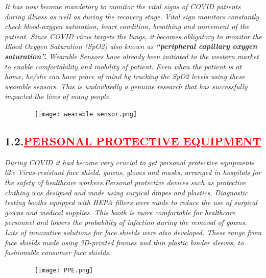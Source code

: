 \documentclass[12pt]{article}
\begin{document}
\hspace{1cm}\large{\emph{It has now become mandatory to monitor the  vital signs of COVID patients during illness as well as during the recovery stage. Vital sign monitors constantly check blood-oxygen saturation, heart condition, breathing and movement of the patient.  Since COVID virus targets the lungs, it becomes obligatory to monitor the Blood Oxygen Saturation (SpO2) also known as \textbf{“peripheral capillary oxygen saturation”.}}}\vspace{1cm}\newline
\hspace{1cm}\large{\emph{Wearable Sensors have already been initiated to the western market to enable comfortability and mobility of patient. Even when the patient is at home, he/she can have peace of mind by tracking the SpO2 levels using these wearable sensors. This is undoubtedly a genuine research that has successfully impacted the lives of many people.}}

\begin{figure}
    \centering
    \texttt{[image: wearable sensor.png]}
\end{figure}

\newpage

\subsection*{\textbf{\hspace{1cm}1.2.\hspace{1cm}\textcolor{red}{\underline{\Large{PERSONAL PROTECTIVE EQUIPMENT}}}}}

\hspace{1cm}\large{\emph{During COVID it had become very crucial to get personal protective equipments like Virus-resistant face shield, gowns, gloves and masks, arranged in hospitals for the safety of healthcare workers.Personal protective devices such as protective clothing was designed and made using surgical drapes and plastics.  Diagnostic testing booths equipped with HEPA filters were made to reduce the use of surgical gowns and medical supplies. This booth is more comfortable for healthcare personnel and lowers the probability of infection during the removal of gowns. Lots of innovative solutions for face shields were also developed. These range from face shields made using 3D-printed frames and thin plastic binder sleeves, to fashionable consumer face shields.}}

\begin{figure}
    \centering
    \texttt{[image: PPE.png]}
\end{figure}
\vspace{3cm}
\newpage
\end{document}
